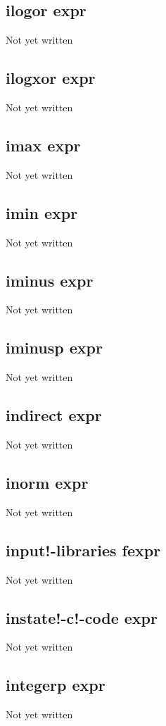 \documentclass[a4paper,11pt]{article}
\begin{document}
{\subsection{\ttfamily ilogor expr}
   Not yet written

\subsection{\ttfamily ilogxor expr}
   Not yet written

\subsection{\ttfamily imax expr}
   Not yet written

\subsection{\ttfamily imin expr}
   Not yet written

\subsection{\ttfamily iminus expr}
   Not yet written

\subsection{\ttfamily iminusp expr}
   Not yet written

\subsection{\ttfamily indirect expr}
   Not yet written

\subsection{\ttfamily inorm expr}
   Not yet written

\subsection{\ttfamily input!-libraries fexpr}
   Not yet written

\subsection{\ttfamily instate!-c!-code expr}
   Not yet written

\subsection{\ttfamily integerp expr}
   Not yet written

}
\end{document}
